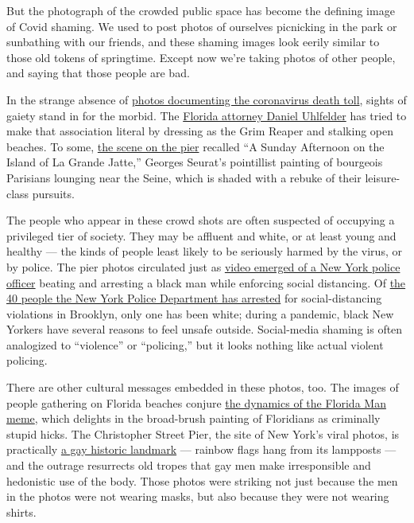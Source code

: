 But the photograph of the crowded public space has become the defining
image of Covid shaming. We used to post photos of ourselves picnicking
in the park or sunbathing with our friends, and these shaming images
look eerily similar to those old tokens of springtime. Except now we're
taking photos of other people, and saying that those people are bad.

In the strange absence of
\href{https://www.nytimes3xbfgragh.onion/2020/05/01/opinion/coronavirus-photography.html}{photos
documenting the coronavirus death toll}, sights of gaiety stand in for
the morbid. The
\href{https://twitter.com/DWUhlfelderLaw/status/1256281243500625929}{Florida
attorney Daniel Uhlfelder} has tried to make that association literal by
dressing as the Grim Reaper and stalking open beaches. To some,
\href{https://twitter.com/MichaelHartney/status/1256731376751120388/photo/1}{the
scene on the pier} recalled ``A Sunday Afternoon on the Island of La
Grande Jatte,'' Georges Seurat's pointillist painting of bourgeois
Parisians lounging near the Seine, which is shaded with a rebuke of
their leisure-class pursuits.

The people who appear in these crowd shots are often suspected of
occupying a privileged tier of society. They may be affluent and white,
or at least young and healthy --- the kinds of people least likely to be
seriously harmed by the virus, or by police. The pier photos circulated
just as
\href{https://www.cbsnews.com/news/nypd-social-distancing-arrest-video-lower-east-side/}{video
emerged of a New York police officer} beating and arresting a black man
while enforcing social distancing. Of
\href{https://www.nytimes3xbfgragh.onion/2020/05/07/nyregion/nypd-social-distancing-race-coronavirus.html}{the
40 people the New York Police Department has arrested} for
social-distancing violations in Brooklyn, only one has been white;
during a pandemic, black New Yorkers have several reasons to feel unsafe
outside. Social-media shaming is often analogized to ``violence'' or
``policing,'' but it looks nothing like actual violent policing.

There are other cultural messages embedded in these photos, too. The
images of people gathering on Florida beaches conjure
\href{https://www.washingtonpost.com/news/magazine/wp/2019/07/15/feature/is-it-okay-to-laugh-at-florida-man-2/}{the
dynamics of the Florida Man meme}, which delights in the broad-brush
painting of Floridians as criminally stupid hicks. The Christopher
Street Pier, the site of New York's viral photos, is practically
\href{https://www.nyclgbtsites.org/site/greenwich-village-waterfront-and-the-christopher-street-pier/}{a
gay historic landmark} --- rainbow flags hang from its lampposts --- and
the outrage resurrects old tropes that gay men make irresponsible and
hedonistic use of the body. Those photos were striking not just because
the men in the photos were not wearing masks, but also because they were
not wearing shirts.


